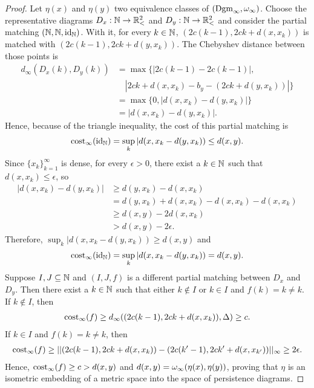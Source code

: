 \begin{proof}
    Let $ \eta(x) $ and $ \eta(y) $ two equivalence classes of $ (\operatorname{Dgm}_\infty, \omega_\infty) $. Choose the representative diagrams $D_x : \mathbb N \to \mathbb{R}_<^2 $ and $D_y : \mathbb N \to \mathbb{R}_<^2 $ and consider the partial matching $ (\mathbb N, \mathbb N, \operatorname{id}_\mathbb N) $. With it, for every $ k \in \mathbb N $, $ (2c(k-1), 2ck + d(x, x_k)) $ is matched with $ (2c(k-1), 2ck + d(y, x_k)) $. The Chebyshev distance between those points is
    \begin{align*}
        d_\infty(D_x(k), D_y(k)) 
        &= \max \big\{|2c(k-1) - 2c(k-1)|, \\
        &\quad |2ck + d(x, x_k) - b_y - (2ck + d(y, x_k))| \big\} \\
        &= \max \{0, |d(x, x_k) - d(y, x_k)|\} \\
        &= |d(x, x_k) - d(y, x_k)|.
    \end{align*}
    Hence, because of the triangle inequality, the cost of this partial matching is
    \begin{align*}
        \operatorname{cost}_\infty(\operatorname{id}_\mathbb N) = \sup_k |d(x, x_k - d(y, x_k)) \leq d(x, y).
    \end{align*}
    Since $ \{ x_k \}_{k=1}^\infty $ is dense, for every $ \epsilon > 0 $, there exist a $ k \in \mathbb N $ such that $ d(x, x_k) \leq \epsilon $, so
    \begin{align*}
        |d(x, x_k) - d(y, x_k)| 
        &\geq d(y, x_k) - d(x, x_k) \\
        &= d(y, x_k) + d(x, x_k) - d(x, x_k) - d(x, x_k) \\
        &\geq d(x, y) - 2d(x, x_k) \\
        &> d(x, y) - 2\epsilon.
    \end{align*}
    Therefore, $ \sup_k |d(x, x_k - d(y, x_k)) \geq d(x, y) $ and
    \begin{align*}
        \operatorname{cost}_\infty(\operatorname{id}_\mathbb N) = \sup_k |d(x, x_k - d(y, x_k)) = d(x, y).
    \end{align*}
    Suppose $ I, J \subseteq \mathbb N $ and $ (I, J, f) $ is a different partial matching between $ D_x $ and $ D_y $. Then there exist a $ k \in \mathbb N $ such that either $ k \notin I $ or $ k \in I $ and $ f(k) = k \neq k $. If $ k \notin I $, then
    \begin{align*}
        \operatorname{cost}_\infty(f) \geq d_\infty((2c(k-1), 2ck + d(x, x_k)), \Delta) \geq c.
    \end{align*}
    If $ k \in I$ and $ f(k) = k \neq k $, then
    \begin{align*}
        \operatorname{cost}_\infty(f) \geq || (2c(k-1), 2ck + d(x, x_k)) - (2c(k'-1), 2ck' + d(x, x_{k'}))||_\infty \geq 2 \epsilon.
    \end{align*}
    Hence, $ \operatorname{cost}_\infty(f) \geq c > d(x, y)$ and $d(x,y) = \omega_\infty(\eta(x), \eta(y)) $, proving that $ \eta $ is an isometric embedding of a metric space into the space of persistence diagrams.
\end{proof}